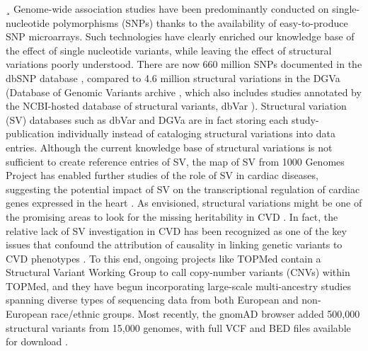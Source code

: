 \documentclass[letter]{bib}
\begin{document}
	¸
	Genome-wide association studies have been predominantly conducted on single-nucleotide polymorphisms (SNPs) thanks to the availability of easy-to-produce SNP microarrays. Such technologies have clearly enriched our knowledge base of the effect of single nucleotide variants, while leaving the effect of structural variations poorly understood. There are now 660 million SNPs documented in the dbSNP database \citep{NCBI:2018:dbSNP}, compared to 4.6 million structural variations in the DGVa (Database of Genomic Variants archive \citep{EMBL-EBI:2018:Database}, which also includes studies annotated by the NCBI-hosted database of structural variants, dbVar \citep{NCBI:2018:dbVar}).  Structural variation (SV) databases such as dbVar and DGVa are in fact storing each study-publication individually instead of cataloging structural variations into data entries. Although the current knowledge base of structural variations is not sufficient to create reference entries of SV, the map of SV from 1000 Genomes Project \citep{Sudmant:2015:integrated} has enabled further studies of the role of SV in cardiac diseases, suggesting the potential impact of SV on the transcriptional regulation of cardiac genes expressed in the heart \citep{Haas:2018:Genomic}. As envisioned, structural variations might be one of the promising areas to look for the missing heritability in CVD \citep{Eichler:2010:Missing}.  In fact, the relative lack of SV investigation in CVD has been recognized as one of the key issues that confound the attribution of causality in linking genetic variants to CVD phenotypes \citep{Macrae:2017:Closing}.  To this end, ongoing projects like TOPMed contain a Structural Variant Working Group to call copy-number variants (CNVs) within TOPMed, and they have begun incorporating large-scale multi-ancestry studies spanning diverse types of sequencing data from both European and non-European race/ethnic groups.  Most recently, the gnomAD browser \citep{Lek:2016:Analysis} added 500,000 structural variants from 15,000 genomes, with full VCF and BED files available for download \citep{Collins:2019:Open}.  
	
\end{document}
